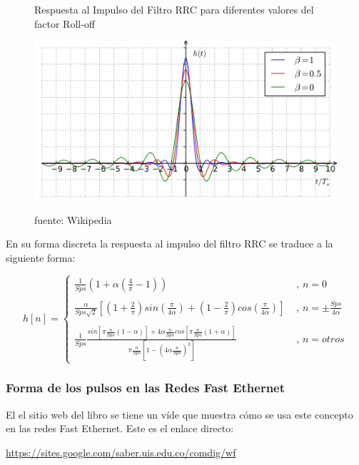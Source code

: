 \begin{figure}[h!]
	\captionsetup{justification = raggedright, singlelinecheck = false}
	\caption{Respuesta al Impulso del Filtro RRC para diferentes valores del factor Roll-off} 
	\centering
	\includegraphics[scale=1]{Imagenes/Factor.png}
	\label{fig:Factor}
	\caption*{fuente: Wikipedia}
\end{figure}

En su forma discreta la respuesta al impulso del filtro RRC se traduce a la siguiente forma: 

\begin{equation} \label{capcuatro_treinta}
 		 h[n]=\begin{cases}
 		 \frac{1}{Sps}(1+\alpha (\frac{4}{\pi}-1)) & \text{ , } n=0 \\ \\ 
 		 \frac{\alpha}{Sps\sqrt{2}}[(1+ \frac{2}{\pi})sin(\frac{\pi}{4 \alpha})+(1- \frac{2}{\pi})cos(\frac{\pi}{4 \alpha})] & \text{ , } n=  \pm \frac{Sps}{4 \alpha}\\ \\ 
 		 \frac{1}{Sps}\frac{sin[ \pi \frac{n}{Sps}(1- \alpha )]+4 \alpha \frac{n}{Sps}cos[ \pi \frac{n}{Sps}(1+\alpha)]}{ \pi \frac{n}{Sps}[1-(4\alpha\frac{n}{Sps})^2]} & \text{ , } n=otros 
 		 \end{cases}
\end{equation}


\subsubsection{Forma de los pulsos en las Redes Fast Ethernet}

El el sitio web del libro se tiene un víde que muestra cómo se usa este concepto en las redes Fast Ethernet. Este es el enlace directo:
\begin{center}
\url{https://sites.google.com/saber.uis.edu.co/comdig/wf} 
\end{center}

